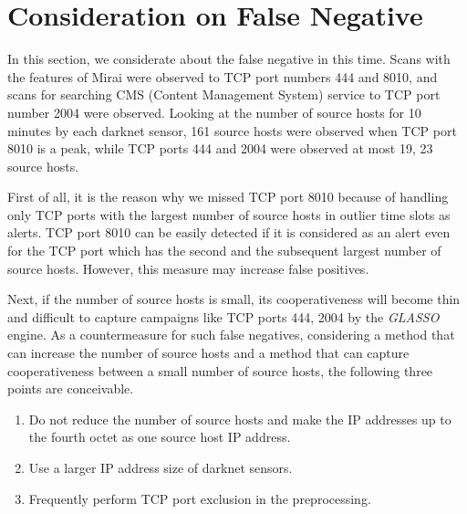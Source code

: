 \documentclass[conference]{IEEEtran}
\begin{document}

\section{Consideration on False Negative}

In this section, we considerate about the false negative in this time.
Scans with the features of Mirai were observed to TCP port numbers 444 and 8010, and scans for searching CMS (Content Management System) service to TCP port number 2004 were observed.
Looking at the number of source hosts for 10 minutes by each darknet sensor, 161 source hosts were observed when TCP port 8010 is a peak, while TCP ports 444 and 2004 were observed at most 19, 23 source hosts.


First of all, it is the reason why we missed TCP port 8010 because of handling only TCP ports with the largest number of source hosts in outlier time slots as alerts.
TCP port 8010 can be easily detected if it is considered as an alert even for the TCP port which has the second and the subsequent largest number of source hosts.
However, this measure may increase false positives.



Next, if the number of source hosts is small, its cooperativeness will become thin and difficult to capture campaigns like TCP ports 444, 2004 by the {\it GLASSO} engine.
As a countermeasure for such false negatives, considering a method that can increase the number of source hosts and a method that can capture cooperativeness between a small number of source hosts, the following three points are conceivable.
\begin{enumerate}
  \item Do not reduce the number of source hosts and make the IP addresses up to the fourth octet as one source host IP address.
  \item Use a larger IP address size of darknet sensors.
  \item Frequently perform TCP port exclusion in the preprocessing.
\end{enumerate}


\end{document}
